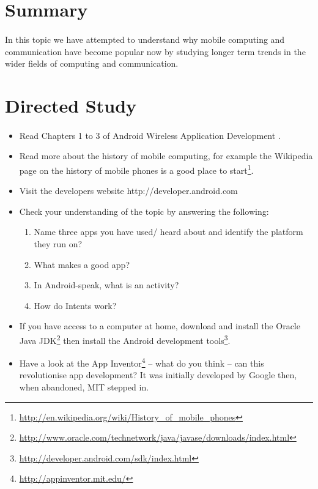 \section{Summary}
\paragraph{} In this topic we have attempted to understand why mobile computing and communication have become popular now by studying longer term trends in the wider fields of computing and communication.

\section{Directed Study}
\paragraph{} 

\begin{itemize}
\item Read Chapters 1 to 3 of Android Wireless Application Development \cite{conder_2010_android_ebook}.
\item Read more about the history of mobile computing, for example the Wikipedia page on the history of mobile phones is a good place to start\footnote{\url{http://en.wikipedia.org/wiki/History_of_mobile_phones}}.
\item Visit the developers website http://developer.android.com
\item Check your understanding of the topic by answering the following:
\begin{enumerate}
\item Name three apps you have used/ heard about and identify the platform they run on?
\item What makes a good app?
\item In Android-speak, what is an activity?
\item How do Intents work?
\end{enumerate}
\item If you have access to a computer at home, download and install the Oracle Java JDK\footnote{\url{http://www.oracle.com/technetwork/java/javase/downloads/index.html}} then install the Android development tools\footnote{\url{http://developer.android.com/sdk/index.html}}.
\item Have a look at the App Inventor\footnote{\url{http://appinventor.mit.edu/}}  – what do you think – can this revolutionise app development? It was initially developed by Google then, when abandoned, MIT stepped in.
\end{itemize}



